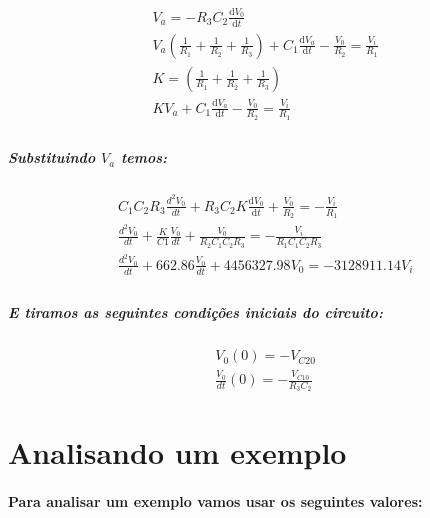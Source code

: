 \documentclass[12pt,twoside, a4paper, twocolumn]{article}
\newcommand\deriv[2]{\frac{\mathrm d #1}{\mathrm d #2}}
\begin{document}
\begin{equation}
    \begin{aligned}
         & V_a = - R_3 C_2 \deriv{V_0}{t}                                                                                          \\
         & V_a \left(\frac{1}{R_1} + \frac{1}{R_2} + \frac{1}{R_3}\right) + C_1 \deriv{V_a}{t} - \frac{V_0}{R_2} = \frac{V_i}{R_1} \\
         & K = \left(\frac{1}{R_1} + \frac{1}{R_2} + \frac{1}{R_3}\right)                                                          \\
         & K V_a  + C_1 \deriv{V_a}{t} - \frac{V_0}{R_2} =\frac{V_i}{R_1}                                                          \\
    \end{aligned}
\end{equation}

\subparagraph*{Substituindo $V_a$ temos:}

\begin{equation}
    \begin{aligned}
         & C_1 C_2 R_3 \frac{d^2 V_0}{dt} + R_3 C_2 K \deriv{V_0}{t}    + \frac{V_0}{R_2} = -\frac{V_i}{R_1}              \\
         & \frac{d^2 V_0}{dt} + \frac{K}{C1} \frac{V_0}{dt} + \frac{V_0}{R_2 C_1 C_2 R_3} = - \frac{V_i}{R_1 C_1 C_2 R_3} \\
         & \frac{d^2 V_0}{dt} + 662.86 \frac{V_0}{dt} + 4456327.98 V_0 = - 3128911.14 V_i                                 \\
    \end{aligned}
\end{equation}

\subparagraph*{E tiramos as seguintes condições iniciais do circuito:}

\begin{equation}
    \begin{aligned}
         & V_0(0)  = - V_{C20}                          \\
         & \frac{V_0}{dt}(0) = -\frac{V_{C10}}{R_3 C_2}
    \end{aligned}
\end{equation}

\section{Analisando um exemplo}

\paragraph*{Para analisar um exemplo vamos usar os seguintes valores:}
\end{document}

